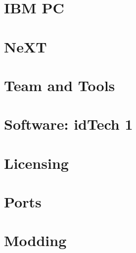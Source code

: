 \documentclass[8pt]{book}
\begin{document}
   
     \chapter{IBM PC}
        
        
        
        
        
        
        
        


     \chapter{NeXT}
          


    

    \chapter{Team and Tools}
          
      
      
      

    \chapter{Software: idTech 1}
      
      
      
      
      
      
      
      
      
      

    \chapter{Licensing}
      
      
      

    \chapter{Ports}        
          

    \chapter{Modding}
      

    \appendix
    \appendixpage
          
      
      
    \cleartoleftpage %
    
    \blankpage
    \blankpage
\end{document}
